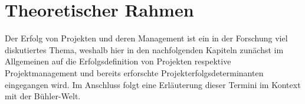 \chapter{Theoretischer Rahmen}\label{sec:theor}
	
Der Erfolg von Projekten und deren Management ist ein in der Forschung viel diskutiertes Thema, weshalb hier in den nachfolgenden Kapiteln zunächst im Allgemeinen auf die Erfolgsdefinition von Projekten respektive Projektmanagement und bereits erforschte Projekterfolgsdeterminanten eingegangen wird. Im Anschluss folgt eine Erläuterung dieser Termini im Kontext mit der Bühler-Welt.

